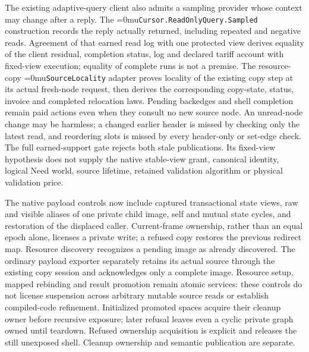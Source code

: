 \documentclass[11pt]{article}
\newcommand{\leanname}[1]{\textup{\Urlmuskip=0mu\relax\nolinkurl{#1}}}
\theoremstyle{definition}
\theoremstyle{remark}
\begin{document}
The existing adaptive-query client also admits a sampling provider whose
context may change after a reply. The
\leanname{Cursor.ReadOnlyQuery.Sampled} construction records the reply actually
returned, including repeated and negative reads. Agreement of that earned
read log with one protected view derives equality of the client residual,
completion status, log and declared tariff account with fixed-view execution;
equality of complete runs is not a premise. The resource-copy
\leanname{SourceLocality} adapter proves locality of the existing copy step
at its actual fresh-node request, then derives the corresponding copy-state,
status, invoice and completed relocation laws. Pending backedges and shell
completion remain paid actions even when they consult no new source node.
An unread-node change may be harmless; a changed earlier header is missed by
checking only the latest read, and reordering slots is missed by every
header-only or set-edge check. The full earned-support gate rejects both
stale publications. Its fixed-view hypothesis does not supply the native
stable-view grant, canonical identity, logical Need world, source lifetime,
retained validation algorithm or physical validation price.

The native payload controls now include captured transactional state views,
raw and visible aliases of one private child image, self and mutual state
cycles, and restoration of the displaced caller. Current-frame ownership,
rather than an equal epoch alone, licenses a private write; a refused copy
restores the previous redirect map. Resource discovery recognizes a pending
image as already discovered. The ordinary payload exporter separately retains
its actual source through the existing copy session and acknowledges only a
complete image. Resource setup, mapped rebinding and result promotion remain
atomic services: these controls do not license suspension across arbitrary
mutable source reads or establish compiled-code refinement.
Initialized promoted spaces acquire their cleanup owner before recursive
exposure; later refusal leaves even a cyclic private graph owned until
teardown. Refused ownership acquisition is explicit and releases the still
unexposed shell. Cleanup ownership and semantic publication are separate.
\end{document}

